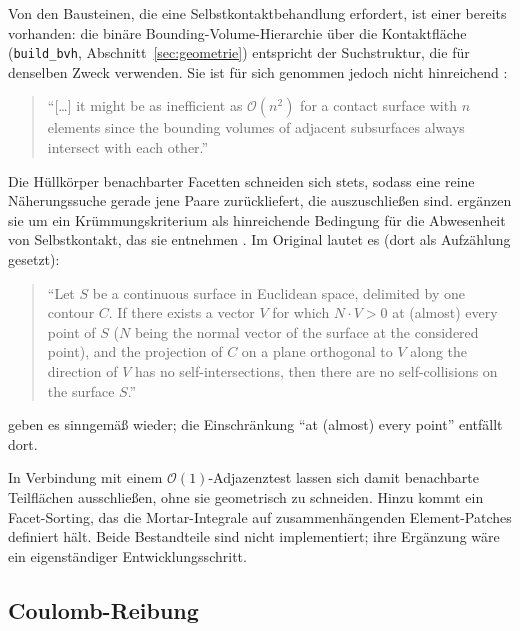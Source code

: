 \documentclass[a4paper,11pt]{article}
\newcommand{\code}[1]{\texttt{\small #1}}
\begin{document}
Von den Bausteinen, die eine Selbstkontaktbehandlung erfordert, ist einer bereits vorhanden: die
binäre Bounding-Volume-Hierarchie über die Kontaktfläche (\code{build\_bvh},
Abschnitt~\ref{sec:geometrie}) entspricht der Suchstruktur, die \citet{yang2008} für denselben
Zweck verwenden. Sie ist für sich genommen jedoch nicht hinreichend
\citep[S.~764]{yang2008}:

\begin{quote}
\small ``[\ldots] it might be as inefficient as $\mathcal{O}(n^2)$ for a contact surface with $n$
elements since the bounding volumes of adjacent subsurfaces always intersect with each other.''
\end{quote}

\noindent Die Hüllkörper benachbarter Facetten schneiden sich stets, sodass eine reine
Näherungssuche gerade jene Paare zurückliefert, die auszuschließen sind. \citet{yang2008} ergänzen
sie um ein Krümmungskriterium als hinreichende Bedingung für die Abwesenheit von Selbstkontakt,
das sie \citet{volino2000} entnehmen \citep[S.~764]{yang2008}. Im Original lautet es
\citep[Abschn.~3.2.2, S.~134]{volino2000} (dort als Aufzählung gesetzt):

\begin{quote}
\small ``Let $S$ be a continuous surface in Euclidean space, delimited by one contour $C$. If
there exists a vector $V$ for which $N\cdot V>0$ at (almost) every point of $S$ ($N$ being the
normal vector of the surface at the considered point), and the projection of $C$ on a plane
orthogonal to $V$ along the direction of $V$ has no self-intersections, then there are no
self-collisions on the surface $S$.''
\end{quote}

\noindent \citet{yang2008} geben es sinngemäß wieder; die Einschränkung ``at (almost) every
point'' entfällt dort.

\noindent In Verbindung mit einem $\mathcal{O}(1)$-Adjazenztest lassen sich damit benachbarte
Teilflächen ausschließen, ohne sie geometrisch zu schneiden. Hinzu kommt ein Facet-Sorting, das die
Mortar-Integrale auf zusammenhängenden Element-Patches definiert hält. Beide Bestandteile sind
nicht implementiert; ihre Ergänzung wäre ein eigenständiger Entwicklungsschritt.

\subsection{Coulomb-Reibung}
\label{sec:ausblick:reibung}
\end{document}
